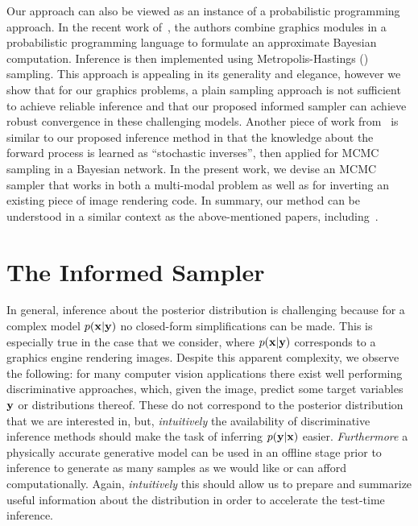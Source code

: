 %
Our approach can also be viewed as an instance of a probabilistic
programming approach. In the recent work
of~\cite{mansinghka2013approximate}, the authors combine graphics
modules in a probabilistic programming language to formulate an
approximate Bayesian computation. Inference is then implemented using
Metropolis-Hastings (\MH) sampling. This approach is appealing in its
generality and elegance, however we show that for our graphics
problems, a plain \MH sampling approach is not sufficient to achieve reliable
inference and that our proposed informed sampler can achieve robust
convergence in these challenging models.
%
Another piece of work from~\cite{stuhlmueller2013nips} is similar to our
proposed inference method in that the knowledge about the forward process is
learned as ``stochastic inverses'', then applied for MCMC sampling in a
Bayesian network.
In the present work, we devise an MCMC sampler that works in both a
multi-modal problem as well as for inverting an existing piece of image
rendering code. In summary, our method can be understood in a similar
context as the above-mentioned papers,
including~\cite{mansinghka2013approximate}.


\section{The Informed Sampler}
\label{sec:model-chap3}

In general, inference about the posterior distribution is challenging
because for a complex model $p(\mathbf{x}|\mathbf{y})$ no closed-form
simplifications can be made. This is especially true in the case that
we consider, where $p(\mathbf{x}|\mathbf{y})$ corresponds to a graphics
engine rendering images.
Despite this apparent complexity, we observe the following: for many
computer vision applications there exist well performing
discriminative approaches, which, given the image, predict some
target variables $\mathbf{y}$ or distributions thereof. These do not correspond
to the posterior distribution that we are interested in, but,
%
\emph{intuitively} the availability of discriminative inference
methods should make the task of inferring $p(\mathbf{y}|\mathbf{x})$ easier.
\emph{Furthermore} a physically accurate generative model can be used in an
offline stage prior to inference to generate as many samples as we would like
or can afford computationally.  Again, \emph{intuitively} this should allow us
to prepare and summarize useful information about the distribution in order to
accelerate the test-time inference.

